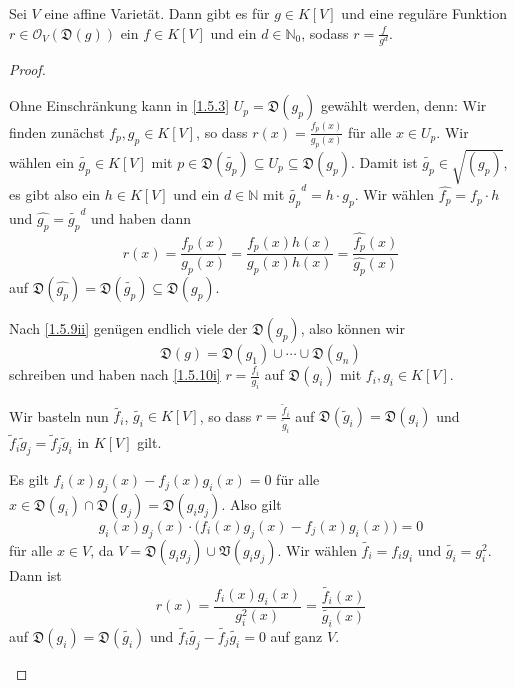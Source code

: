 \documentclass[a4paper,12pt,index=toc]{scrbook}
\theoremstyle{keinenummern} %
\def\V{\mathfrak{V}}
\def\O{\mathcal{O}}
\newcommand{\D}{\mathfrak{D}}
\newcommand{\schlange}[1]{\widetilde{#1}}
\newcommand{\set}[1]{\ensuremath{\mathbb{#1}}}
\newcommand{\N}{\set{N}}
\newcommand{\dach}{\widehat}
\begin{document}
\begin{prop}\label{1.5.10}
  Sei $V$ eine affine Varietät. Dann gibt es für $g\in K[V]$ und eine reguläre Funktion $r\in\O_V(\D(g))$ ein $f\in K[V]$ und ein
  $d\in\N_0$, sodass $r=\frac{f}{g^d}$.
\end{prop}
\begin{proof}
  \begin{prooflist}
  \item{} Ohne Einschränkung kann in \cref{1.5.3} $U_p=\D(g_p)$ gewählt werden, denn: Wir finden zunächst $f_{p},g_{p}\in K[V]$, so dass
    $r(x)=\frac{f_p(x)}{g_p(x)}$ für alle $x\in U_p$. Wir wählen ein $\schlange{g_p}\in K[V]$ mit $p\in \D(\schlange{g_p})\subseteq U_{p}\subseteq \D(g_{p})$. Damit ist $\schlange{g_p}\in\sqrt{(g_p)}$, es gibt also ein $h\in K[V]$ und ein $d\in\N$
    mit $\schlange{g_p}^{d}=h\cdot g_p$. Wir wählen $\dach{f_{p}}=f_p\cdot h$ und $\dach{g_p}=\schlange{g_p}^d$ und haben
    dann \begin{equation*}r(x)=\frac{f_p(x)}{g_p(x)} = \frac{f_p(x)h(x)}{g_p(x)h(x)} = \frac{\dach{f_p}(x)}{\dach{g_p}(x)}\end{equation*}
    auf $\D(\dach{g_p})=\D(\schlange{g_p})\subseteq \D(g_p)$.
  \item Nach \cref{1.5.9ii} genügen endlich viele der $\D(g_p)$, also können wir \begin{equation*}\D(g)=\D(g_1)\cup\dotsm\cup
    \D(g_n)\end{equation*} schreiben und haben nach \ref{1.5.10i} $r=\frac{f_i}{g_i}$ auf $\D(g_i)$ mit $f_i,g_i\in K[V]$.

     Wir basteln nun $\schlange{f_i}$, $\schlange{g_i}\in K[V]$, so dass $r=\frac{\schlange{f}_i}{\schlange{g}_i}$ auf $\D(\schlange{g}_i)=\D(g_i)$ und
      $\schlange{f}_i\schlange{g}_j=\schlange{f}_j\schlange{g}_i$ in $K[V]$ gilt.

    Es gilt $f_i(x)g_j(x)-f_j(x)g_i(x)=0$ für alle $x\in \D(g_i)\cap \D(g_j)=\D(g_ig_j)$. Also gilt
    \begin{equation*}g_i(x)g_j(x)\cdot\bigl(f_i(x)g_j(x)-f_j(x)g_i(x)\bigr)=0\end{equation*} für alle $x\in V$, da $V=\D(g_ig_j)\cup\V(g_ig_j)$. Wir wählen
    $\schlange{f_i}=f_ig_i$ und $\schlange{g_i}=g_i^2$. Dann ist \begin{equation*}r(x)=\frac{f_i(x)g_i(x)}{g_i^2(x)} =
    \frac{\schlange{f_i}(x)}{\schlange{g_i}(x)}\end{equation*} auf $\D(g_i)=\D(\schlange{g_i})$ und $\schlange{f_i}\schlange{g_j}-\schlange{f_j}\schlange{g_i}=0$ auf
    ganz $V$.


\end{prooflist}
\end{proof}
\end{document}

